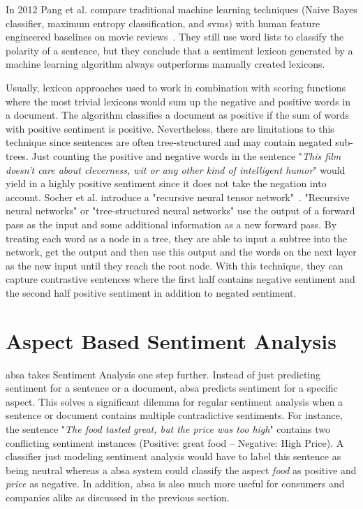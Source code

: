 In 2012 Pang et al. compare traditional machine learning techniques {(Naive Bayes classifier, maximum entropy classification, and \glspl{svm})} with human feature engineered baselines on movie reviews~\cite{Pang2012}. They still use word lists to classify the polarity of a sentence, but they conclude that a sentiment lexicon generated by a machine learning algorithm always outperforms manually created lexicons.
\medskip


Usually, lexicon approaches used to work in combination with scoring functions where the most trivial lexicons would sum up the negative and positive words in a document. The algorithm classifies a document as positive if the sum of words with positive sentiment is positive. Nevertheless, there are limitations to this technique since sentences are often tree-structured and may contain negated sub-trees. Just counting the positive and negative words in the sentence "\textit{This film doesn't care about cleverness, wit or any other kind of intelligent humor}" would yield in a highly positive sentiment since it does not take the negation into account. Socher et al. introduce a "recursive neural tensor network"~\cite{Socher2013}. "Recursive neural networks" or "tree-structured neural networks" use the output of a forward pass as the input and some additional information as a new forward pass. By treating each word as a node in a tree, they are able to input a subtree into the network, get the output and then use this output and the words on the next layer as the new input until they reach the root node. With this technique, they can capture contrastive sentences where the first half contains negative sentiment and the second half positive sentiment in addition to negated sentiment. 
\medskip

\section{Aspect Based Sentiment Analysis}
\label{sec:02_absa}

\acrfull{absa} takes Sentiment Analysis one step further. Instead of just predicting sentiment for a sentence or a document, \gls{absa} predicts sentiment for a specific aspect. This solves a significant dilemma for regular sentiment analysis when a sentence or document contains multiple contradictive sentiments. For instance, the sentence "\textit{The food tasted great, but the price was too high}" contains two conflicting sentiment instances {(Positive: great food -- Negative: High Price)}. A classifier just modeling sentiment analysis would have to label this sentence as being neutral whereas a \gls{absa} system could classify the aspect \textit{food} as positive and \textit{price} as negative. In addition, \gls{absa} is also much more useful for consumers and companies alike as discussed in the previous section.
\medskip


